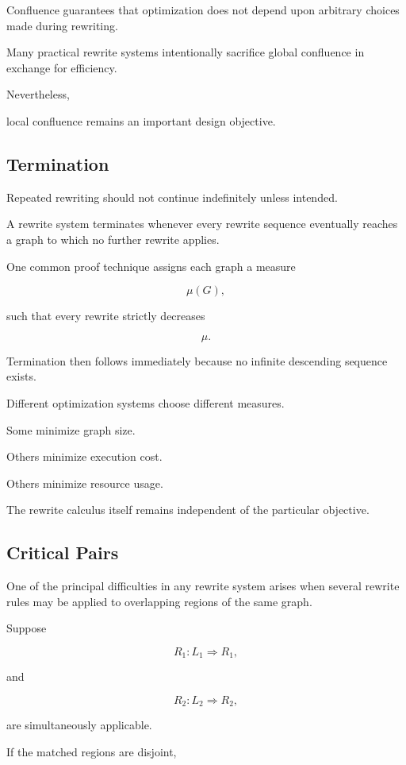 \documentclass[12pt,oneside]{article}
\begin{document}
Confluence guarantees that optimization does not depend upon arbitrary choices made during rewriting.

Many practical rewrite systems intentionally sacrifice global confluence in exchange for efficiency.

Nevertheless,

local confluence remains an important design objective.

\subsection{Termination}

Repeated rewriting should not continue indefinitely unless intended.

A rewrite system terminates whenever every rewrite sequence eventually reaches a graph to which no further rewrite applies.

One common proof technique assigns each graph a measure

\[
\mu(G),
\]

such that every rewrite strictly decreases

\[
\mu.
\]

Termination then follows immediately because no infinite descending sequence exists.

Different optimization systems choose different measures.

Some minimize graph size.

Others minimize execution cost.

Others minimize resource usage.

The rewrite calculus itself remains independent of the particular objective.


\subsection{Critical Pairs}

One of the principal difficulties in any rewrite system arises when several rewrite rules may be applied to overlapping regions of the same graph.

Suppose

\[
R_1
:
L_1
\Longrightarrow
R_1,
\]

and

\[
R_2
:
L_2
\Longrightarrow
R_2,
\]

are simultaneously applicable.

If the matched regions are disjoint,
\end{document}
